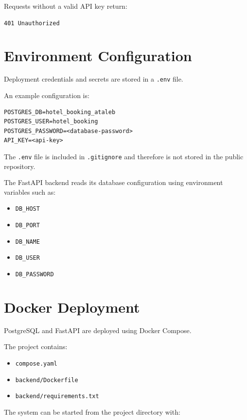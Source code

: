 \documentclass[12pt,a4paper]{article}
\begin{document}
Requests without a valid API key return:

\begin{center}
\texttt{401 Unauthorized}
\end{center}

\section{Environment Configuration}

Deployment credentials and secrets are stored in a \texttt{.env} file.

An example configuration is:

\begin{lstlisting}
POSTGRES_DB=hotel_booking_ataleb
POSTGRES_USER=hotel_booking
POSTGRES_PASSWORD=<database-password>
API_KEY=<api-key>
\end{lstlisting}

The \texttt{.env} file is included in \texttt{.gitignore} and therefore
is not stored in the public repository.

The FastAPI backend reads its database configuration using environment
variables such as:

\begin{itemize}
    \item \texttt{DB\_HOST}
    \item \texttt{DB\_PORT}
    \item \texttt{DB\_NAME}
    \item \texttt{DB\_USER}
    \item \texttt{DB\_PASSWORD}
\end{itemize}

\section{Docker Deployment}

PostgreSQL and FastAPI are deployed using Docker Compose.

The project contains:

\begin{itemize}
    \item \texttt{compose.yaml}
    \item \texttt{backend/Dockerfile}
    \item \texttt{backend/requirements.txt}
\end{itemize}

The system can be started from the project directory with:
\end{document}
